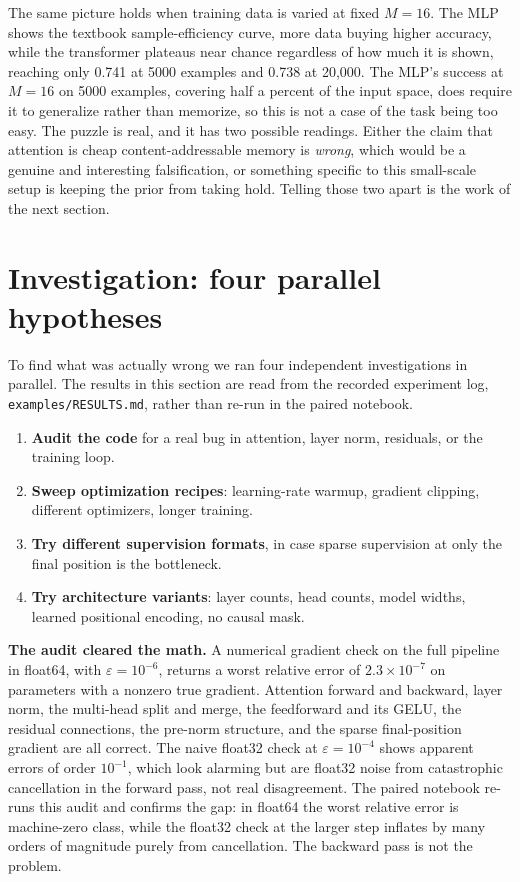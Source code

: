 The same picture holds when training data is varied at fixed $M=16$. The MLP
shows the textbook sample-efficiency curve, more data buying higher accuracy,
while the transformer plateaus near chance regardless of how much it is shown,
reaching only 0.741 at 5000 examples and 0.738 at 20{,}000. The MLP's success
at $M=16$ on 5000 examples, covering half a percent of the input space, does
require it to generalize rather than memorize, so this is not a case of the
task being too easy. The puzzle is real, and it has two possible readings.
Either the claim that attention is cheap content-addressable memory is
\emph{wrong}, which would be a genuine and interesting falsification, or
something specific to this small-scale setup is keeping the prior from taking
hold. Telling those two apart is the work of the next section.

\section{Investigation: four parallel hypotheses}\label{sec:four-hypotheses}

To find what was actually wrong we ran four independent investigations in
parallel. The results in this section are read from the recorded experiment
log, \texttt{examples/RESULTS.md}, rather than re-run in the paired notebook.

\begin{enumerate}
\item \textbf{Audit the code} for a real bug in attention, layer norm,
residuals, or the training loop.
\item \textbf{Sweep optimization recipes}: learning-rate warmup, gradient
clipping, different optimizers, longer training.
\item \textbf{Try different supervision formats}, in case sparse supervision
at only the final position is the bottleneck.
\item \textbf{Try architecture variants}: layer counts, head counts, model
widths, learned positional encoding, no causal mask.
\end{enumerate}

\textbf{The audit cleared the math.} A numerical gradient check on the full
pipeline in float64, with $\varepsilon = 10^{-6}$, returns a worst relative
error of $2.3 \times 10^{-7}$ on parameters with a nonzero true gradient.
Attention forward and backward, layer norm, the multi-head split and merge,
the feedforward and its GELU, the residual connections, the pre-norm
structure, and the sparse final-position gradient are all correct. The naive
float32 check at $\varepsilon = 10^{-4}$ shows apparent errors of order
$10^{-1}$, which look alarming but are float32 noise from catastrophic
cancellation in the forward pass, not real disagreement. The paired notebook
re-runs this audit and confirms the gap: in float64 the worst relative error
is machine-zero class, while the float32 check at the larger step inflates by
many orders of magnitude purely from cancellation. The backward pass is not
the problem.

